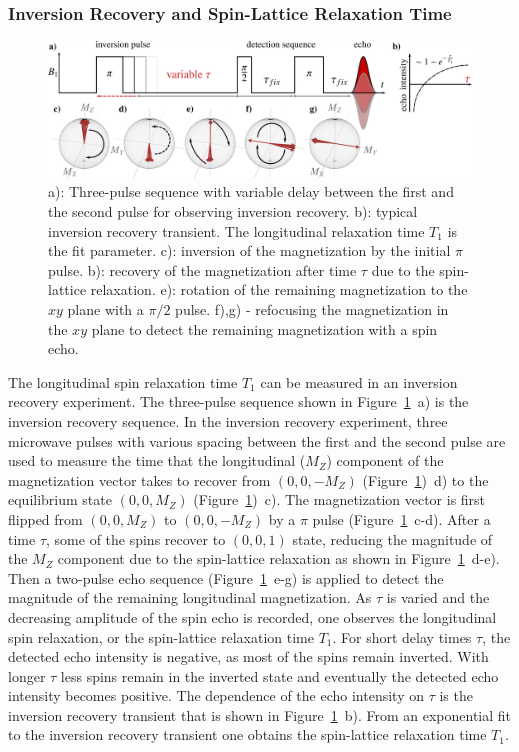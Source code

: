 \subsubsection{Inversion Recovery and Spin-Lattice Relaxation Time}
\begin{figure}[h]
\center
	\includegraphics[width=1\textwidth]{./epr_basics/inversion_recovery.pdf}
	\caption{a): Three-pulse sequence with variable delay between the first and the second pulse for observing inversion recovery. b): typical inversion recovery transient. The longitudinal relaxation time $T_1$ is the fit parameter. c): inversion of the magnetization by the initial $\pi$ pulse. b): recovery of the magnetization after time $\tau$ due to the spin-lattice relaxation. e): rotation of the remaining magnetization to the $xy$ plane with a $\pi/2$ pulse. f),g) - refocusing the magnetization in the $xy$ plane to detect the remaining magnetization with a spin echo.}
	\label{fig:T1_diagram}
\end{figure}

The longitudinal spin relaxation time $T_1$ can be measured in an inversion recovery experiment. The three-pulse sequence shown in Figure~\ref{fig:T1_diagram}~a) is the inversion recovery sequence. In the inversion recovery experiment, three microwave pulses with various spacing between the first and the second pulse are used to measure the time that the longitudinal ($M_Z$) component of the magnetization vector takes to recover from $(0,0,-M_Z)$ (Figure~\ref{fig:T1_diagram})~d) to the equilibrium state $(0,0,M_Z)$ (Figure~\ref{fig:T1_diagram})~c). The magnetization vector is first flipped from $(0,0,M_Z)$ to $(0,0,-M_Z)$ by a $\pi$ pulse (Figure~\ref{fig:T1_diagram}~c-d). After a time $\tau$, some of the spins recover to $(0,0,1)$ state, reducing the magnitude of the $M_Z$ component due to the spin-lattice relaxation as shown in Figure~\ref{fig:T1_diagram}~d-e). Then a two-pulse echo sequence (Figure~\ref{fig:T1_diagram}~e-g) is applied to detect the magnitude of the remaining longitudinal magnetization. As $\tau$ is varied and the decreasing amplitude of the spin echo is recorded, one observes the longitudinal spin relaxation, or the spin-lattice relaxation time $T_1$. For short delay times $\tau$, the detected echo intensity is negative, as most of the spins remain inverted. With longer $\tau$ less spins remain in the inverted state and eventually the detected echo intensity becomes positive. The dependence of the echo intensity on $\tau$ is the inversion recovery transient that is shown in Figure~\ref{fig:T1_diagram}~b). From an exponential fit to the inversion recovery transient one obtains the spin-lattice relaxation time $T_1$.\\